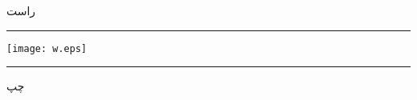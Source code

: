 \documentclass{article}
\newcommand\HR{\rule{1em}{0.4pt}}
\begin{document}
راست\HR
 \texttt{[image: w.eps]}%
\HR چپ
\end{document}
